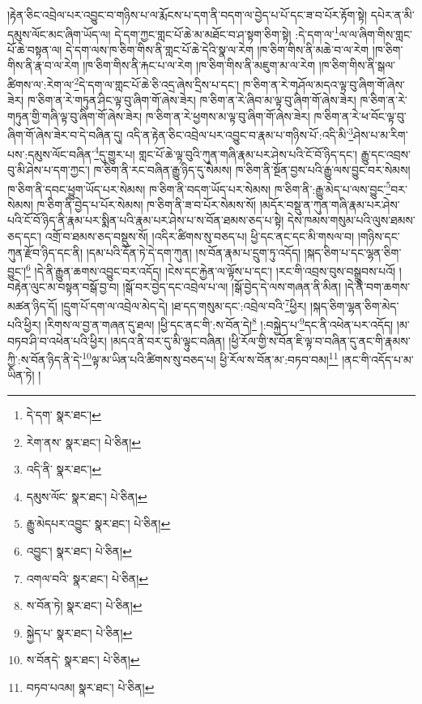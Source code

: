 །རྟེན་ཅིང་འབྲེལ་པར་འབྱུང་བ་གཉིས་པ་ལ་རྨོངས་པ་དག་ནི་བདག་ལ་བྱེད་པ་པོ་དང་ཟ་བ་པོར་རྟོག་སྟེ། དཔེར་ན་མི་དམུས་ལོང་མང་ཞིག་ཡོད་ལ། དེ་དག་ཀྱང་གླང་པོ་ཆེ་མ་མཐོང་བ་ཤ་སྟག་ཅིག་སྟེ། :དེ་དག་ལ་\footnote{དེ་དག་  སྣར་ཐང་། }ལ་ལ་ཞིག་གིས་གླང་པོ་ཆེ་བསྟན་ལ། དེ་དག་ལས་ཁ་ཅིག་གིས་ནི་གླང་པོ་ཆེ་དེའི་སྣ་ལ་རེག །ཁ་ཅིག་གིས་ནི་མཆེ་བ་ལ་རེག །ཁ་ཅིག་གིས་ནི་རྣ་བ་ལ་རེག །ཁ་ཅིག་གིས་ནི་རྐང་པ་ལ་རེག །ཁ་ཅིག་གིས་ནི་མཇུག་མ་ལ་རེག །ཁ་ཅིག་གིས་ནི་སྒལ་ཚིགས་ལ་:རེག་ལ་\footnote{རེག་ནས་  སྣར་ཐང་།  པེ་ཅིན། }དེ་དག་ལ་གླང་པོ་ཆེ་ཅི་འདྲ་ཞེས་དྲིས་པ་དང་། ཁ་ཅིག་ན་རེ་གཤོལ་མདའ་ལྟ་བུ་ཞིག་གོ་ཞེས་ཟེར། ཁ་ཅིག་ན་རེ་གཏུན་ཤིང་ལྟ་བུ་ཞིག་གོ་ཞེས་ཟེར། ཁ་ཅིག་ན་རེ་ཞིབ་མ་ལྟ་བུ་ཞིག་གོ་ཞེས་ཟེར། ཁ་ཅིག་ན་རེ་གཏུན་གྱི་གཞི་ལྟ་བུ་ཞིག་གོ་ཞེས་ཟེར། ཁ་ཅིག་ན་རེ་ཕྱགས་མ་ལྟ་བུ་ཞིག་གོ་ཞེས་ཟེར། ཁ་ཅིག་ན་རེ་ཕ་བོང་ལྟ་བུ་ཞིག་གོ་ཞེས་ཟེར་བ་དེ་བཞིན་དུ། འདི་ན་རྟེན་ཅིང་འབྲེལ་པར་འབྱུང་བ་རྣམ་པ་གཉིས་པོ་:འདི་མི་\footnote{འདི་ནི་  སྣར་ཐང་། }ཤེས་པ་མ་རིག་པས་:དམུས་ལོང་བཞིན་\footnote{དམུས་ལོང་  སྣར་ཐང་།  པེ་ཅིན། }དུ་གྱུར་པ། གླང་པོ་ཆེ་ལྟ་བུའི་ཀུན་གཞི་རྣམ་པར་ཤེས་པའི་ངོ་བོ་ཉིད་དང་། རྒྱུ་དང་འབྲས་བུ་མི་ཤེས་པ་དག་ཀྱང་། ཁ་ཅིག་ནི་རང་བཞིན་རྒྱུ་ཉིད་དུ་སེམས། ཁ་ཅིག་ནི་སྔོན་བྱས་པའི་རྒྱུ་ལས་བྱུང་བར་སེམས། ཁ་ཅིག་ནི་དབང་ཕྱུག་ཡོད་པར་སེམས། ཁ་ཅིག་ནི་བདག་ཡོད་པར་སེམས། ཁ་ཅིག་ནི་:རྒྱུ་མེད་པ་ལས་བྱུང་\footnote{རྒྱུ་མེདཔར་འབྱུང་  སྣར་ཐང་།  པེ་ཅིན། }བར་སེམས། ཁ་ཅིག་ནི་བྱེད་པ་པོར་སེམས། ཁ་ཅིག་ནི་ཟ་བ་པོར་སེམས་སོ། །མདོར་བསྡུ་ན་ཀུན་གཞི་རྣམ་པར་ཤེས་པའི་ངོ་བོ་ཉིད་ནི་རྣམ་པར་སྨིན་པའི་རྣམ་པར་ཤེས་པ་ས་བོན་ཐམས་ཅད་པ་སྟེ། དེས་ཁམས་གསུམ་པའི་ལུས་ཐམས་ཅད་དང་། འགྲོ་བ་ཐམས་ཅད་བསྡུས་སོ། །འདིར་ཚིགས་སུ་བཅད་པ། ཕྱི་དང་ནང་དང་མི་གསལ་བ། །གཉིས་དང་ཀུན་རྫོབ་ཉིད་དང་ནི། །དམ་པའི་དོན་ཏེ་དེ་དག་ཀུན། །ས་བོན་རྣམ་པ་དྲུག་ཏུ་འདོད། །སྐད་ཅིག་པ་དང་ལྷན་ཅིག་བྱུང་།\footnote{འབྱུང་།  སྣར་ཐང་།  པེ་ཅིན། } །དེ་ནི་རྒྱུན་ཆགས་འབྱུང་བར་འདོད། །ངེས་དང་རྐྱེན་ལ་ལྟོས་པ་དང་། །རང་གི་འབྲས་བུས་བསྒྲུབས་པའོ། །བརྟེན་ལུང་མ་བསྟན་བསྒོ་བྱ་བ། །སྒོ་བར་བྱེད་དང་འབྲེལ་པ་ལ། །སྒོ་བྱེད་དེ་ལས་གཞན་ནི་མིན། །དེ་ནི་བག་ཆགས་མཚན་ཉིད་དོ། །དྲུག་པོ་དག་ལ་འབྲེལ་མེད་དེ། །ཐ་དད་གསུམ་དང་:འབྲེལ་བའི་\footnote{འགལ་བའི་  སྣར་ཐང་།  པེ་ཅིན། }ཕྱིར། །སྐད་ཅིག་ལྷན་ཅིག་མེད་པའི་ཕྱིར། །རིགས་ལ་བྱ་ན་གཞན་དུ་ཐལ། །ཕྱི་དང་ནང་གི་:ས་བོན་དེ།\footnote{ས་བོན་ཏེ།  སྣར་ཐང་།  པེ་ཅིན། } །:བསྐྱེད་པ་\footnote{སྐྱེད་པ་  སྣར་ཐང་།  པེ་ཅིན། }དང་ནི་འཕེན་པར་འདོད། །མ་བཏབ་ཤི་བ་འཕེན་པའི་ཕྱིར། །མདའ་ནི་བར་དུ་མི་ལྟུང་བཞིན། །ཕྱི་རོལ་གྱི་ས་བོན་ཇི་ལྟ་བ་བཞིན་དུ་ནང་གི་རྣམས་ཀྱི་:ས་བོན་ཉིད་ནི་དེ་\footnote{ས་བོནདེ་  སྣར་ཐང་།  པེ་ཅིན། }ལྟ་མ་ཡིན་པའི་ཚིགས་སུ་བཅད་པ། ཕྱི་རོལ་ས་བོན་མ་:བཏབ་བམ།\footnote{བཏབ་པའམ།  སྣར་ཐང་།  པེ་ཅིན། } །ནང་གི་འདོད་པ་མ་ཡིན་ཏེ། །
